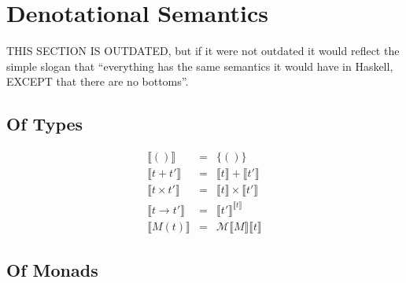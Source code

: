 \documentclass{article}[11pt]
\begin{document}
\vspace{1em}
\vspace{1em}
\vspace{1em}
\vspace{1em}
\vspace{1em}
\vspace{1em}

\section{Denotational Semantics}

THIS SECTION IS OUTDATED, but if it were not outdated it would reflect the simple slogan that ``everything has the same semantics it would have in Haskell, EXCEPT that there are no bottoms''.

\subsection{Of Types}

\begin{eqnarray*}
\llbracket{}()\rrbracket &=& \{()\}\\
\llbracket{}t+t'\rrbracket &=& \llbracket{}t\rrbracket + \llbracket{}t'\rrbracket\\
\llbracket{}t\times{}t'\rrbracket &=& \llbracket{}t\rrbracket \times \llbracket{}t'\rrbracket\\
\llbracket{}t\rightarrow{}t'\rrbracket &=& \llbracket{}t'\rrbracket^{\llbracket{}t\rrbracket}\\
\llbracket{}M(t)\rrbracket &=& \mathcal{M}\llbracket{}M\rrbracket\llbracket{}t\rrbracket
\end{eqnarray*}

\subsection{Of Monads}
\end{document}
